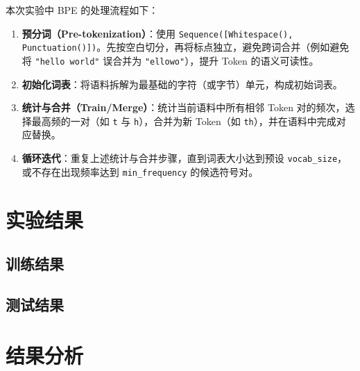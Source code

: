 \documentclass[a4paper,12pt]{ctexart} %
\begin{document}
本次实验中 BPE 的处理流程如下：
\begin{enumerate}
    \item \textbf{预分词（Pre-tokenization）}：使用 \texttt{Sequence([Whitespace(), Punctuation()])}。先按空白切分，再将标点独立，避免跨词合并（例如避免将 \texttt{"hello world"} 误合并为 \texttt{"ellowo"}），提升 Token 的语义可读性。
    \item \textbf{初始化词表}：将语料拆解为最基础的字符（或字节）单元，构成初始词表。
    \item \textbf{统计与合并（Train/Merge）}：统计当前语料中所有相邻 Token 对的频次，选择最高频的一对（如 \texttt{t} 与 \texttt{h}），合并为新 Token（如 \texttt{th}），并在语料中完成对应替换。
    \item \textbf{循环迭代}：重复上述统计与合并步骤，直到词表大小达到预设 \texttt{vocab\_size}，或不存在出现频率达到 \texttt{min\_frequency} 的候选符号对。
\end{enumerate}

\section{实验结果}


\subsection{训练结果}


\subsection{测试结果}


\section{结果分析}
\end{document}
